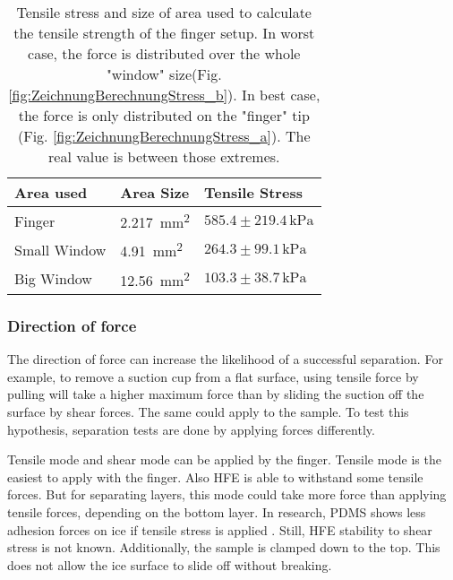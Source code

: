 \begin{table}[hbt!]
	\centering
	\begin{tabular}{|l|l|l|}
		\hline
		Area used & Area Size & Tensile Stress\\
		\hline
		\hline
		Finger & \SI{2.217}{\milli\meter\squared} & $585.4\pm219.4\,\si{\kilo\pascal}$ \\ 
		\hline
		Small Window & \SI{4.91}{\milli\meter\squared} & $264.3\pm99.1\,\si{\kilo\pascal}$ \\ 
		\hline
		Big Window & \SI{12.56}{\milli\meter\squared} & $103.3\pm38.7\,\si{\kilo\pascal}$ \\ 
		\hline
	\end{tabular}
	\caption{Tensile stress and size of area used to calculate the tensile strength of the finger setup. In worst case, the force is distributed over the whole "window" size(Fig. \ref{fig:ZeichnungBerechnungStress_b}). In best case, the force is only distributed on the "finger" tip (Fig. \ref{fig:ZeichnungBerechnungStress_a}). The real value is between those extremes.}
	\label{table:VerschAbschätzungenStressFinger}
\end{table}

\FloatBarrier

\subsubsection{Direction of force}

The direction of force can increase the likelihood of a successful separation. For example, to remove a suction cup from a flat surface, using tensile force by pulling will take a higher maximum force than by sliding the suction off the surface by shear forces. The same could apply to the sample. To test this hypothesis, separation tests are done by applying forces differently.

Tensile mode and shear mode can be applied by the finger. Tensile mode is the easiest to apply with the finger. Also HFE is able to withstand some tensile forces. But for separating layers, this mode could take more force than applying tensile forces, depending on the bottom layer. In research, PDMS shows less adhesion forces on ice if tensile stress is applied \cite{IbanezIbanez.2022}. Still, HFE stability to shear stress is not known. Additionally, the sample is clamped down to the top. This does not allow the ice surface to slide off without breaking.

